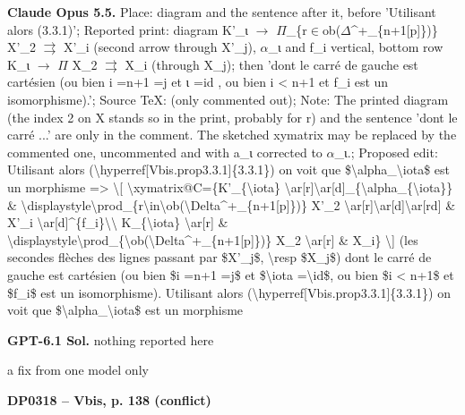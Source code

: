 \textbf{Claude Opus 5.5.} Place: diagram and the sentence after it, before 'Utilisant alors (3.3.1)'; Reported print: diagram K'\_ι \ensuremath{\to} \ensuremath{\Pi}\_\{r\ensuremath{\in}ob(\ensuremath{\Delta}\textasciicircum{}+\_\{n+1[p]\})\} X'\_2 \ensuremath{\rightrightarrows} X'\_i (second arrow through X'\_j), \ensuremath{\alpha}\_ι and f\_i vertical, bottom row K\_ι \ensuremath{\to} \ensuremath{\Pi} X\_2 \ensuremath{\rightrightarrows} X\_i (through X\_j); then 'dont le carré de gauche est cartésien (ou bien i =\allowbreak  n+1 =\allowbreak  j et ι =\allowbreak  id , ou bien i < n+1 et f\_i est un isomorphisme).'; Source TeX: (only commented out); Note: The printed diagram (the index 2 on X stands so in the print, probably for r) and the sentence 'dont le carré ...' are only in the comment. The sketched xymatrix may be replaced by the commented one, uncommented and with a\_ι corrected to \ensuremath{\alpha}\_ι.; Proposed edit: Utilisant alors (\textbackslash{}hyperref[Vbis.prop3.3.1]\{3.3.1\}) on voit que \$\textbackslash{}alpha\_\textbackslash{}iota\$ est un morphisme =\allowbreak > \textbackslash{}[ \textbackslash{}xymatrix@C=\allowbreak 1.5cm\{K'\_\{\textbackslash{}iota\} \textbackslash{}ar[r]\textbackslash{}ar[d]\_\{\textbackslash{}alpha\_\{\textbackslash{}iota\}\} \& \textbackslash{}displaystyle\textbackslash{}prod\_\{r\textbackslash{}in\textbackslash{}ob(\textbackslash{}Delta\textasciicircum{}+\_\{n+1[p]\})\} X'\_2 \textbackslash{}ar[r]\textbackslash{}ar[d]\textbackslash{}ar[rd] \& X'\_i \textbackslash{}ar[d]\textasciicircum{}\{f\_i\}\textbackslash{}\textbackslash{} K\_\{\textbackslash{}iota\} \textbackslash{}ar[r] \& \textbackslash{}displaystyle\textbackslash{}prod\_\{\textbackslash{}ob(\textbackslash{}Delta\textasciicircum{}+\_\{n+1[p]\})\} X\_2 \textbackslash{}ar[r] \& X\_i\} \textbackslash{}] (les secondes flèches des lignes passant par \$X'\_j\$, \textbackslash{}resp \$X\_j\$) dont le carré de gauche est cartésien (ou bien \$i =\allowbreak  n+1 =\allowbreak  j\$ et \$\textbackslash{}iota =\allowbreak  \textbackslash{}id\$, ou bien \$i < n+1\$ et \$f\_i\$ est un isomorphisme). Utilisant alors (\textbackslash{}hyperref[Vbis.prop3.3.1]\{3.3.1\}) on voit que \$\textbackslash{}alpha\_\textbackslash{}iota\$ est un morphisme\par
\textbf{GPT-6.1 Sol.} nothing reported here\par
a fix from one model only\par
\par\noindent\hypertarget{DP0318}{}\textbf{DP0318 -- Vbis, p. 138 (conflict)}\par
